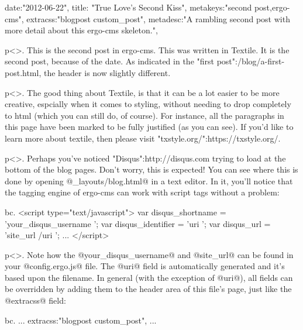 {
date:"2012-06-22",
title: "True Love's Second Kiss",
metakeys:"second post,ergo-cms",
extracss:"blogpost custom_post",
metadesc:"A rambling second post with more detail about this ergo-cms skeleton.",
}

p<>. This is the second post in ergo-cms. This was written in Textile. It is the second post, because of the date. As indicated in the "first post":/blog/a-first-post.html, the header is now slightly different.

p<>. The good thing about Textile, is that it can be a lot easier to be more creative, espcially when it comes to styling, without needing to drop completely to html (which you can still do, of course). For instance, all the paragraphs in this page have been marked to be fully justified (as you can see). If you'd like to learn more about textile, then please visit "txstyle.org/":https://txstyle.org/. 

p<>. Perhaps you've noticed "Disqus":http://disqus.com trying to load at the bottom of the blog pages. Don't worry, this is expected! You can see where this is done by opening @_layouts/blog.html@ in a text editor. In it, you'll notice that the tagging engine of ergo-cms can work with script tags without a problem:



bc. <script type="text/javascript">
	var disqus_shortname = '{your_disqus_username }';
	var disqus_identifier = '{uri }';
	var disqus_url = '{site_url }/{uri }';
	...
</script>

p<>. Note how the @your_disqus_username@ and @site_url@ can be found in your @config.ergo.js@ file. The @uri@ field is automatically generated and it's based upon the filename. In general (with the exception of @uri@), all fields can be overridden by adding them to the header area of this file's page, just like the @extracss@ field:

bc. {
...
extracss:"blogpost custom_post",
...
}


